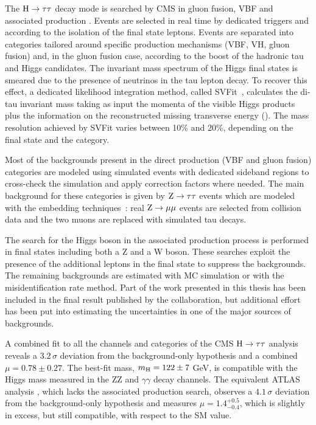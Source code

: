The $\mathrm{H} \to \tau \tau$ decay mode is searched by CMS in gluon fusion, VBF and associated production \cite{H_tautau}. Events are selected in real time by dedicated triggers and according to the isolation of the final state leptons. Events are separated into categories tailored around specific production mechanisms (VBF, VH, gluon fusion) and, in the gluon fusion case, according to the boost of the hadronic tau and Higgs candidates. The invariant mass spectrum of the Higgs final states is smeared due to the presence of neutrinos in the tau lepton decay. To recover this effect, a dedicated likelihood integration method, called SVFit~\cite{Bianchini:2014vza}, calculates the di-tau invariant mass taking as input the momenta of the visible Higgs products plus the information on the reconstructed missing transverse energy (\MET). The mass resolution achieved by SVFit varies between 10\% and 20\%, depending on the final state and the category.

Most of the backgrounds present in the direct production (VBF and gluon fusion) categories are modeled using simulated events with dedicated sideband regions to cross-check the simulation and apply correction factors where needed. The main background for these categories is given by $\mathrm{Z} \rightarrow \tau\tau$ events which are modeled with the embedding techniques~\cite{CMS_AN_2011-020}: real $\mathrm{Z} \rightarrow \mu \mu$ events are selected from collision data and the two muons are replaced with simulated tau decays.

The search for the Higgs boson in the associated production process is performed in final states including both a Z and a W boson. These searches exploit the presence of the additional leptons in the final state to suppress the backgrounds. The remaining backgrounds are estimated with MC simulation or with the misidentification rate method. Part of the work presented in this thesis has been included in the final result published by the collaboration, but additional effort has been put into estimating the uncertainties in one of the major sources of backgrounds. 

A combined fit to all the channels and categories of the CMS $\mathrm{H} \rightarrow \tau\tau$ analysis reveals a $3.2\,\sigma$ deviation from the background-only hypothesis and a combined $\mu = 0.78 \pm 0.27$. %
The best-fit mass, $m_{\mathrm{H}} = 122 \pm 7$ GeV, is compatible with the Higgs mass measured in the ZZ and $\gamma\gamma$ decay channels. The equivalent ATLAS analysis \cite{ATLASCONF:2013108}, which lacks the associated production search, observes a $4.1\,\sigma$ deviation from the background-only hypothesis and measures $\mu = 1.4^{+0.5}_{-0.4}$, which is slightly in excess, but still compatible, with respect to the SM value.


